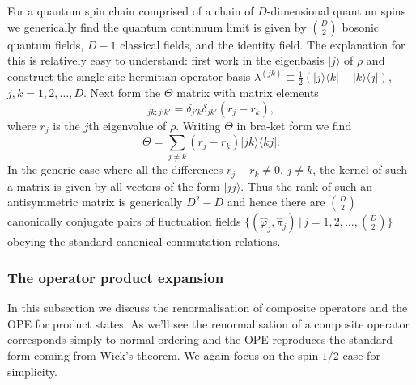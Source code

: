 \documentclass[prl,twocolumn,lengthcheck,superscriptaddress]{revtex4-1}
\theoremstyle{definition}
\theoremstyle{remark}
\begin{document}
For a quantum spin chain comprised of a chain of $D$-dimensional quantum spins we generically find the quantum continuum limit is given by $\binom{D}{2}$ bosonic quantum fields, $D-1$ classical fields, and the identity field. The explanation for this is relatively easy to understand: first work in the eigenbasis $|j\rangle$ of $\rho$ and construct the single-site hermitian operator basis $\lambda^{(jk)} \equiv \frac12(|j\rangle\langle k|+|k\rangle\langle j|)$, $j,k = 1, 2, \ldots, D$. Next form the $\Theta$ matrix with matrix elements 
\begin{equation}
	[\Theta]_{jk;j'k'} = \delta_{j'k}\delta_{jk'}( r_j - r_k),
\end{equation}
where $r_j$ is the $j$th eigenvalue of $\rho$. Writing $\Theta$ in bra-ket form we find 
\begin{equation}
	\Theta  = \sum_{j\not= k} (r_j-r_k) |jk\rangle\langle kj|.
\end{equation}
In the generic case where all the differences $r_j-r_k \not=0$, $j\not=k$, the kernel of such a matrix is given by all vectors of the form $|jj\rangle$. Thus the rank of such an antisymmetric matrix is generically $D^2-D$ and hence there are $\binom{D}{2}$ canonically conjugate pairs of fluctuation fields $\{(\widehat{\varphi}_j, \widehat{\pi}_j)\,|\, j= 1, 2, \ldots, \binom{D}{2}\}$ obeying the standard canonical commutation relations. 

\subsubsection{The operator product expansion}
In this subsection we discuss the renormalisation of composite operators and the OPE for product states. As we'll see the renormalisation of a composite operator corresponds simply to normal ordering and the OPE reproduces the standard form coming from Wick's theorem. We again focus on the spin-$1/2$ case for simplicity.
\end{document}
